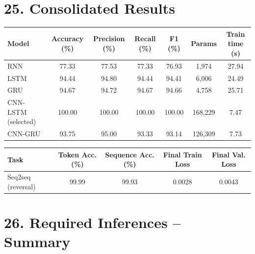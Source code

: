 \documentclass[10pt]{article}
\begin{document}
\section*{25. Consolidated Results}

\begin{center}
\begin{tabular}{|l|c|c|c|c|c|c|}
\hline
Model & Accuracy (\%) & Precision (\%) & Recall (\%) & F1 (\%) & Params & Train time (s)\\
\hline
RNN & 77.33 & 77.53 & 77.33 & 76.93 & 1{,}974 & 27.94\\
LSTM & 94.44 & 94.80 & 94.44 & 94.41 & 6{,}006 & 24.49\\
GRU & 94.67 & 94.72 & 94.67 & 94.66 & 4{,}758 & 25.71\\
CNN-LSTM (selected) & 100.00 & 100.00 & 100.00 & 100.00 & 168{,}229 & 7.47\\
CNN-GRU & 93.75 & 95.00 & 93.33 & 93.14 & 126{,}309 & 7.73\\
\hline
\end{tabular}
\end{center}

\begin{center}
\begin{tabular}{|l|c|c|c|c|}
\hline
Task & Token Acc. (\%) & Sequence Acc. (\%) & Final Train Loss & Final Val. Loss\\
\hline
Seq2seq (reversal) & 99.99 & 99.93 & 0.0028 & 0.0043\\
\hline
\end{tabular}
\end{center}

\section*{26. Required Inferences -- Summary}
\end{document}
